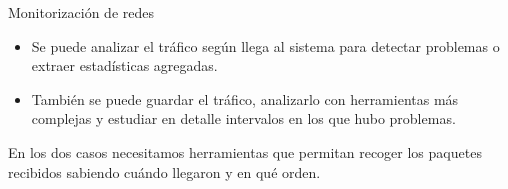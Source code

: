 \documentclass[10pt,notes,compress,usetitleprogressbar,aspectratio=1610]{beamer}
\begin{document}
\begin{frame}{Monitorización de redes}

\begin{itemize}
\item Se puede analizar el tráfico según llega al sistema para detectar problemas o extraer estadísticas agregadas. 
\item También se puede guardar el tráfico, analizarlo con herramientas más complejas y  estudiar en detalle intervalos en los que hubo problemas.
\end{itemize}

En los dos casos necesitamos herramientas que permitan recoger los paquetes recibidos sabiendo cuándo llegaron y en qué orden. 

\end{frame}
\end{document}
